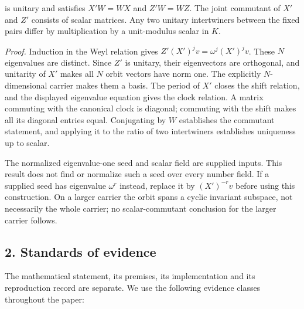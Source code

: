\documentclass[
  11pt,
]{article}
\begin{document}
is unitary and satisfies \(X'W=WX\) and \(Z'W=WZ\). The joint commutant
of \(X'\) and \(Z'\) consists of scalar matrices. Any two unitary
intertwiners between the fixed pairs differ by multiplication by a
unit-modulus scalar in \(K\).

\emph{Proof.} Induction in the Weyl relation gives
\(Z'(X')^j v = \omega^j (X')^j v\). These \(N\) eigenvalues are
distinct. Since \(Z'\) is unitary, their eigenvectors are orthogonal,
and unitarity of \(X'\) makes all \(N\) orbit vectors have norm one. The
explicitly \(N\)-dimensional carrier makes them a basis. The period of
\(X'\) closes the shift relation, and the displayed eigenvalue equation
gives the clock relation. A matrix commuting with the canonical clock is
diagonal; commuting with the shift makes all its diagonal entries equal.
Conjugating by \(W\) establishes the commutant statement, and applying
it to the ratio of two intertwiners establishes uniqueness up to scalar.

The normalized eigenvalue-one seed and scalar field are supplied inputs.
This result does not find or normalize such a seed over every number
field. If a supplied seed has eigenvalue \(\omega^r\) instead, replace
it by \((X')^{-r}v\) before using this construction. On a larger carrier
the orbit spans a cyclic invariant subspace, not necessarily the whole
carrier; no scalar-commutant conclusion for the larger carrier follows.

\subsection{2. Standards of evidence}\label{standards-of-evidence}

The mathematical statement, its premises, its implementation and its
reproduction record are separate. We use the following evidence classes
throughout the paper:
\end{document}
